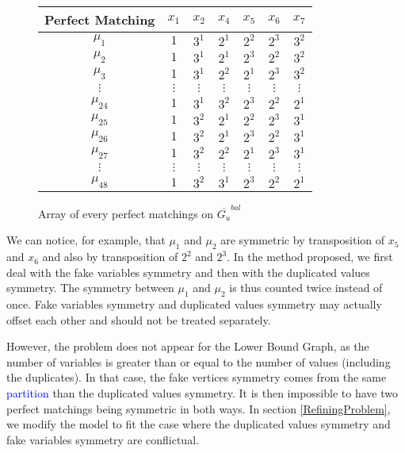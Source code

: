 \documentclass[jair,twoside,11pt,theapa]{article}
\newcommand{\minor}[1]{\textcolor{blue}{#1}}
\begin{document}
\begin{figure}
	\centering
	\begin{tabular}{|c|cccccc|}
 	 \hline
 		 Perfect Matching & $x_1$ & $x_2$ & $x_4$ & $x_5$ & $x_6$ & $x_7$ \\
 	 \hline
  		$\mu_1$ & $1$ & $3^1$ & $2^1$ & $2^2$ & $2^3$ & $3^2$ \\
  		$\mu_2$ & $1$& $3^1$ & $2^1$ & $2^3$ & $2^2$ & $3^2$ \\
  		$\mu_3$ & $1$& $3^1$ & $2^2$ & $2^1$ & $2^3$ & $3^2$ \\
  		$\vdots$ & $\vdots$  & $\vdots$  & $\vdots$  & $\vdots$  & $\vdots$ &  $\vdots$  \\
  		$\mu_{24}$ & $1$ & $3^1$ & $3^2$ & $2^3$ & $2^2$ & $2^1$ \\
  		$\mu_{25}$ & $1$ & $3^2$ & $2^1$ & $2^2$ & $2^3$ & $3^1$ \\
  		$\mu_{26}$ & $1$& $3^2$ & $2^1$ & $2^3$ & $2^2$ & $3^1$ \\
  		$\mu_{27}$ & $1$& $3^2$ & $2^2$ & $2^1$ & $2^3$ & $3^1$ \\
  		$\vdots$ & $\vdots$  & $\vdots$  & $\vdots$  & $\vdots$  & $\vdots$ &  $\vdots$  \\
  		$\mu_{48}$ & $1$ & $3^2$ & $3^1$ & $2^3$ & $2^2$ & $2^1$ \\
  	\hline
	\end{tabular}
	\caption{Array of every perfect matchings on $\overline{G_u}^{bal}$ }
	\label{listPerfectMatching}
\end{figure}
We can notice, for example, that $\mu_1$ and $\mu_2$ are symmetric by transposition of $x_5$ and $x_6$ and also by transposition of $2^2$ and $2^3$. In the method proposed, we first deal with the fake variables symmetry and then with the duplicated values symmetry. The symmetry between $\mu_1$ and $\mu_2$ is thus counted twice instead of once. Fake variables symmetry and duplicated values symmetry  may actually offset each other and should not be treated separately.
	
However, the problem does not appear for the Lower Bound Graph, as the number of variables is greater than or equal to the number of values (including the duplicates). In that case, the fake vertices symmetry comes from the same \minor{partition} than the duplicated values symmetry. It is then impossible to have two perfect matchings being symmetric in both ways. In section \ref{RefiningProblem}, we modify the model to fit the case where the duplicated values symmetry and fake variables symmetry are conflictual.
\end{document}
